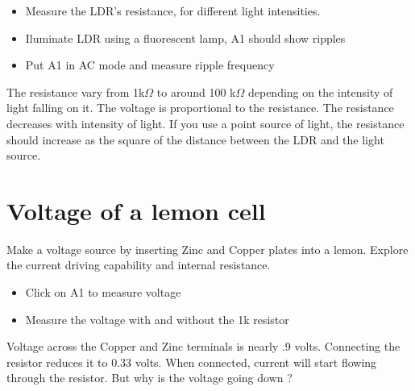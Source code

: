 \documentclass[a4paper,12pt,english]{sphinxmanual}
\let\sphinxpxdimen\pdfpxdimen\else\newdimen\sphinxpxdimen
\begin{document}
\noindent\sphinxincludegraphics[width=300\sphinxpxdimen]{{ldr}.pdf}

\begin{itemize}
\item {} 
Measure the LDR’s resistance, for different light intensities.

\item {} 
Iluminate LDR using a fluorescent lamp, A1 should show ripples

\item {} 
Put A1 in AC mode and measure ripple frequency

\end{itemize}


The resistance vary from 1k\(\Omega\) to around 100 k\(\Omega\) depending on the intensity
of light falling on it. The voltage is proportional to the resistance.
The resistance decreases with intensity of light. If you use a point
source of light, the resistance should increase as the square of the
distance between the LDR and the light source.


\section{Voltage of a lemon cell}
\label{\detokenize{2.11:voltage-of-a-lemon-cell}}\label{\detokenize{2.11::doc}}

Make a voltage source by inserting Zinc and Copper plates into a lemon.
Explore the current driving capability and internal resistance.

\noindent\sphinxincludegraphics[width=300\sphinxpxdimen]{{lemon-cell}.pdf}

\begin{itemize}
\item {} 
Click on A1 to measure voltage

\item {} 
Measure the voltage with and without the 1k resistor

\end{itemize}


Voltage across the Copper and Zinc terminals is nearly .9 volts.
Connecting the resistor reduces it to 0.33 volts. When connected,
current will start flowing through the resistor. But why is the voltage
going down ?
\end{document}
